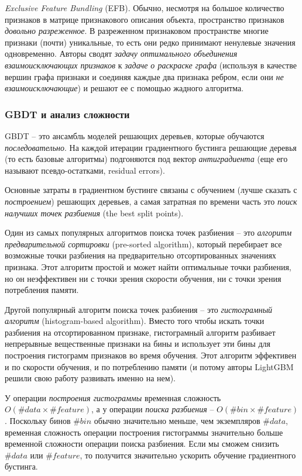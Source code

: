 \documentclass[%
	11pt,
	a4paper,
	utf8,
		]{article}
\begin{document}
\emph{Exclusive Feature Bundling} (EFB). Обычно, несмотря на большое количество признаков в матрице признакового описания объекта, пространство признаков \emph{довольно разреженное}. В разреженном признаковом пространстве многие признаки (почти) уникальные, то есть они редко принимают ненулевые значения одновременно. Авторы сводят \emph{задачу оптимального объединения взаимоисключающих признаков} к \emph{задаче о раскраске графа} (используя в качестве вершин графа признаки и соединяя каждые два признака ребром, если они \emph{не взаимоисключающие}) и решают ее с помощью жадного алгоритма.

\subsubsection{GBDT и анализ сложности}

GBDT -- это ансамбль моделей решающих деревьев, которые обучаются \emph{последовательно}. На каждой итерации градиентного бустинга решающие деревья (то есть базовые алгоритмы) подгоняются под вектор \emph{антиградиента} (еще его называют псевдо-остатками, residual errors).

Основные затраты в градиентном бустинге связаны с обучением (лучше сказать с \emph{построением}) решающих деревьев, а самая затратная по времени часть это \emph{поиск налучших точек разбиения} (the best split points).

Один из самых популярных алгоритмов поиска точек разбиения -- это \emph{алгоритм предварительной сортировки} (pre-sorted algorithm), который перебирает все возможные точки разбиения на предварительно отсортированных значениях признака. Этот алгоритм простой и может найти оптимальные точки разбиения, но он неэффективен ни с точки зрения скорости обучения, ни с точки зрения потребления памяти.

Другой популярный алгоритм поиска точек разбиения -- это \emph{гистограмный алгоритм} (histogram-based algorithm). Вместо того чтобы искать точки разбиения на отсортированном признаке, гистограмный алгоритм разбивает непрерывные вещественные признаки на бины и использует эти бины для построения гистограмм признаков во время обучения. Этот алгоритм эффективен и по скорости обучения, и по потреблению памяти (и потому авторы LightGBM решили свою работу развивать именно на нем).

У операции \emph{построения гистограммы} временная сложность $ O(\#data \times \#feature) $, а у операции \emph{поиска разбиения} -- $ O(\#bin \times \#feature) $. Поскольку бинов $ \#bin $ обычно значительно меньше, чем экземпляров $ \#data $, временная сложность операции построения гистограммы значительно больше временной сложности операции поиска разбиения. Если мы сможем снизить $ \#data $ или $ \#feature $, то получится значительно ускорить обучение градиентного бустинга.
\end{document}
